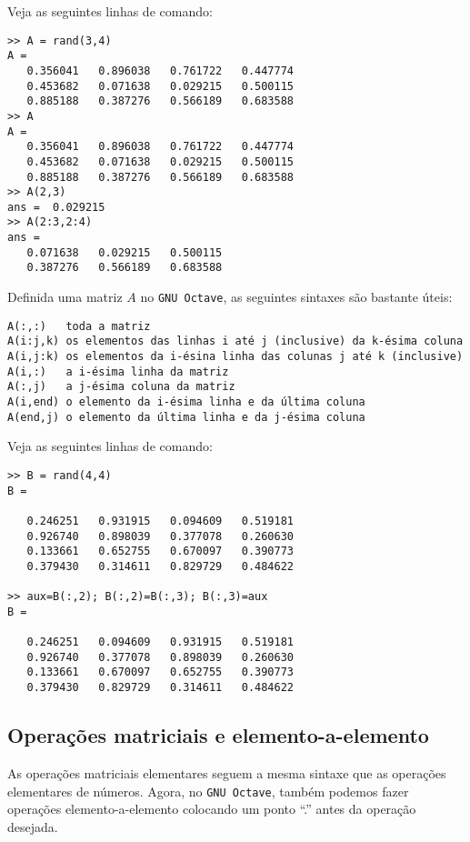 \begin{ex}
  Veja as seguintes linhas de comando:
\begin{verbatim}
>> A = rand(3,4)
A =
   0.356041   0.896038   0.761722   0.447774
   0.453682   0.071638   0.029215   0.500115
   0.885188   0.387276   0.566189   0.683588
>> A
A =
   0.356041   0.896038   0.761722   0.447774
   0.453682   0.071638   0.029215   0.500115
   0.885188   0.387276   0.566189   0.683588
>> A(2,3)
ans =  0.029215
>> A(2:3,2:4)
ans =
   0.071638   0.029215   0.500115
   0.387276   0.566189   0.683588
\end{verbatim}
\end{ex}

Definida uma matriz $A$ no \verb+GNU Octave+, as seguintes sintaxes são bastante úteis:
\begin{verbatim}
A(:,:)   toda a matriz
A(i:j,k) os elementos das linhas i até j (inclusive) da k-ésima coluna
A(i,j:k) os elementos da i-ésina linha das colunas j até k (inclusive)
A(i,:)   a i-ésima linha da matriz
A(:,j)   a j-ésima coluna da matriz
A(i,end) o elemento da i-ésima linha e da última coluna
A(end,j) o elemento da última linha e da j-ésima coluna
\end{verbatim}

\begin{ex}
Veja as seguintes linhas de comando:
\begin{verbatim}
>> B = rand(4,4)
B =

   0.246251   0.931915   0.094609   0.519181
   0.926740   0.898039   0.377078   0.260630
   0.133661   0.652755   0.670097   0.390773
   0.379430   0.314611   0.829729   0.484622

>> aux=B(:,2); B(:,2)=B(:,3); B(:,3)=aux
B =

   0.246251   0.094609   0.931915   0.519181
   0.926740   0.377078   0.898039   0.260630
   0.133661   0.670097   0.652755   0.390773
   0.379430   0.829729   0.314611   0.484622
\end{verbatim}
\end{ex}

\subsection{Operações matriciais e elemento-a-elemento}

As operações matriciais elementares seguem a mesma sintaxe que as operações elementares de números. Agora, no \verb+GNU Octave+, também podemos fazer operações elemento-a-elemento colocando um ponto ``.'' antes da operação desejada.

